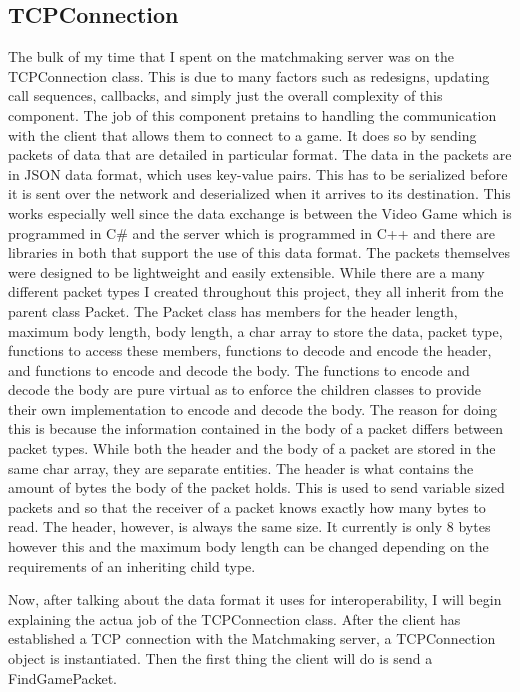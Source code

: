 \documentclass[conference]{IEEEtran}
\begin{document}
\subsection{TCPConnection}
The bulk of my time that I spent on the matchmaking server was on the TCPConnection class.
This is due to many factors such as redesigns, updating call sequences, callbacks, and simply just the overall complexity of this component.
The job of this component pretains to handling the communication with the client that allows them to connect to a game.
It does so by sending packets of data that are detailed in particular format.
The data in the packets are in JSON data format, which uses key-value pairs. 
This has to be serialized before it is sent over the network and deserialized when it arrives to its destination.
This works especially well since the data exchange is between the Video Game which is programmed in C# and the server which is programmed in C++ and there are libraries in both that support the use of this data format.
The packets themselves were designed to be lightweight and easily extensible.
While there are a many different packet types I created throughout this project, they all inherit from the parent class Packet.
The Packet class has members for the header length, maximum body length, body length, a char array to store the data, packet type, functions to access these members, functions to decode and encode the header, and functions to encode and decode the body.
The functions to encode and decode the body are pure virtual as to enforce the children classes to provide their own implementation to encode and decode the body.
The reason for doing this is because the information contained in the body of a packet differs between packet types.
While both the header and the body of a packet are stored in the same char array, they are separate entities.
The header is what contains the amount of bytes the body of the packet holds.
This is used to send variable sized packets and so that the receiver of a packet knows exactly how many bytes to read.
The header, however, is always the same size.
It currently is only 8 bytes however this and the maximum body length can be changed depending on the requirements of an inheriting child type. \par
Now, after talking about the data format it uses for interoperability, I will begin explaining the actua job of the TCPConnection class.
After the client has established a TCP connection with the Matchmaking server, a TCPConnection object is instantiated.
Then the first thing the client will do is send a FindGamePacket.
\end{document}
